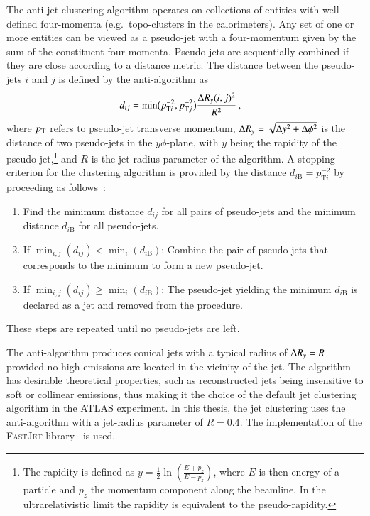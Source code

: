 The anti-\kt jet clustering algorithm operates on collections of entities with
well-defined four-momenta (e.g.\ topo-clusters in the calorimeters). Any set of
one or more entities can be viewed as a pseudo-jet with a four-momentum given by
the sum of the constituent four-momenta. Pseudo-jets are sequentially combined
if they are close according to a distance metric. The distance between the
pseudo-jets $i$ and $j$ is defined by the anti-\kt algorithm
as~\cite{Cacciari:2008gp}
\begin{align*}
  d_{ij} &= \min\bigl( p_{\text{T}i}^{-2}, p_{\text{T}j}^{-2} \bigr)
           \frac{ \Delta R_y(i, j)^2 }{ R^2 } \,\text{,}
\end{align*}
where $p_{\text{T}}$ refers to pseudo-jet transverse momentum,
$\Delta R_y = \sqrt{\Delta y^2 + \Delta \phi^2}$ is the distance of two pseudo-jets in
the $y\phi$-plane, with $y$ being the rapidity of the pseudo-jet,\footnote{The
  rapidity is defined as
  $y = \frac{1}{2} \ln \left( \frac{E + p_z}{E - p_z} \right)$, where $E$ is
  then energy of a particle and $p_z$ the momentum component along the
  beamline. In the ultrarelativistic limit the rapidity is equivalent to the
  pseudo-rapidity.} and $R$ is the jet-radius parameter of the algorithm. A
stopping criterion for the clustering algorithm is provided by the distance
$d_{i\text{B}} = p_{\text{T}i}^{-2}$ by proceeding as
follows~\cite{Cacciari:2008gp}:
\begin{enumerate}
\item Find the minimum distance $d_{ij}$ for all pairs of pseudo-jets and the
  minimum distance $d_{i\text{B}}$ for all pseudo-jets.

\item If $\min_{i,j}(d_{ij}) < \min_{i}(d_{i\text{B}})$: Combine the pair of
  pseudo-jets that corresponds to the minimum to form a new pseudo-jet. \\

\item If $\min_{i,j}(d_{ij}) \geq \min_{i}(d_{i\text{B}})$: The pseudo-jet
  yielding the minimum $d_{i\text{B}}$ is declared as a jet and removed from the
  procedure.
\end{enumerate}
These steps are repeated until no pseudo-jets are left.

The anti-\kt algorithm produces conical jets with a typical radius of $\Delta R_y = R$
provided no high-\pT emissions are located in the vicinity of the jet. The
algorithm has desirable theoretical properties, such as reconstructed jets being
insensitive to soft or collinear emissions, thus making it the choice of the
default jet clustering algorithm in the ATLAS experiment. In this thesis, the
jet clustering uses the anti-\kt algorithm with a jet-radius parameter of
$R = 0.4$. The implementation of the \textsc{FastJet} library~\cite{Fastjet} is
used.


